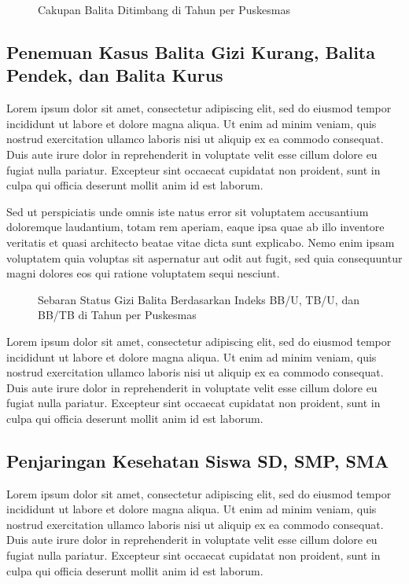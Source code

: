 \begin{figure}[H]
  \centering
  \caption{Cakupan Balita Ditimbang di \namaKabupaten Tahun \tP per Puskesmas}
  \label{fig:Cakupan-Balita-Ditimbang}
\end{figure}

\subsection{Penemuan Kasus Balita Gizi Kurang, Balita Pendek, dan Balita Kurus}
\label{subsec:Penemuan-Kasus-Gizi-Kurang}
Lorem ipsum dolor sit amet, consectetur adipiscing elit, sed do eiusmod tempor incididunt ut labore et dolore magna aliqua. Ut enim ad minim veniam, quis nostrud exercitation ullamco laboris nisi ut aliquip ex ea commodo consequat. Duis aute irure dolor in reprehenderit in voluptate velit esse cillum dolore eu fugiat nulla pariatur. Excepteur sint occaecat cupidatat non proident, sunt in culpa qui officia deserunt mollit anim id est laborum.

Sed ut perspiciatis unde omnis iste natus error sit voluptatem accusantium doloremque laudantium, totam rem aperiam, eaque ipsa quae ab illo inventore veritatis et quasi architecto beatae vitae dicta sunt explicabo. Nemo enim ipsam voluptatem quia voluptas sit aspernatur aut odit aut fugit, sed quia consequuntur magni dolores eos qui ratione voluptatem sequi nesciunt.

\begin{figure}[H]
  \centering
  \caption{Sebaran Status Gizi Balita Berdasarkan Indeks BB/U, TB/U, dan BB/TB di \namaKabupaten Tahun \tP per
Puskesmas}
  \label{fig:Status-Gizi-Balita}
\end{figure}

Lorem ipsum dolor sit amet, consectetur adipiscing elit, sed do eiusmod tempor incididunt ut labore et dolore magna aliqua. Ut enim ad minim veniam, quis nostrud exercitation ullamco laboris nisi ut aliquip ex ea commodo consequat. Duis aute irure dolor in reprehenderit in voluptate velit esse cillum dolore eu fugiat nulla pariatur. Excepteur sint occaecat cupidatat non proident, sunt in culpa qui officia deserunt mollit anim id est laborum.

\subsection{Penjaringan Kesehatan Siswa SD, SMP, SMA}
Lorem ipsum dolor sit amet, consectetur adipiscing elit, sed do eiusmod tempor incididunt ut labore et dolore magna aliqua. Ut enim ad minim veniam, quis nostrud exercitation ullamco laboris nisi ut aliquip ex ea commodo consequat. Duis aute irure dolor in reprehenderit in voluptate velit esse cillum dolore eu fugiat nulla pariatur. Excepteur sint occaecat cupidatat non proident, sunt in culpa qui officia deserunt mollit anim id est laborum.

